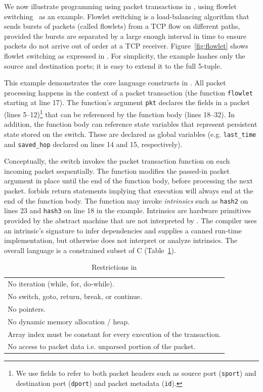 We now illustrate programming using packet transactions in \pktlanguage, using
flowlet switching~\cite{flowlets} as an example. Flowlet switching is a
load-balancing algorithm that sends bursts of packets (called flowlets) from a
TCP flow on different paths, provided the bursts are separated by a large
enough interval in time to ensure packets do not arrive out of order at a TCP
receiver. Figure~\ref{fig:flowlet} shows flowlet switching as expressed in
\pktlanguage. For simplicity, the example hashes only the source and
destination ports; it is easy to extend it to the full 5-tuple.

This example demonstrates the core language constructs in \pktlanguage. All
packet processing happens in the context of a packet transaction (the function
\texttt{flowlet} starting at line 17). The function's argument {\tt pkt} declares the
fields in a packet (lines 5--12)\footnote{We use fields to refer to both packet
headers such as source port ({\tt sport}) and destination port ({\tt dport})
and packet metadata ({\tt id}).} that can be referenced by the function body
(lines 18--32).  In addition, the function body can reference state variables
that represent persistent state stored on the switch. These are declared as
global variables (e.g. \texttt{last\_time} and \texttt{saved\_hop} declared on
lines 14 and 15, respectively).

Conceptually, the switch invokes the packet transaction function on each
incoming packet sequentially. The function modifies the passed-in packet
argument in place until the end of the function body, before processing the
next packet.  \pktlanguage forbids return statements implying that execution
will always end at the end of the function body. The function may invoke
\textit{intrinsics} such as \texttt{hash2} on lines 23 and \texttt{hash3} on
line 18 in the example.  Intrinsics are hardware primitives provided by the
abstract machine that are not interpreted by \pktlanguage. The \pktlanguage
compiler uses an intrinsic's signature to infer dependencies and supplies a
canned run-time implementation, but otherwise does not interpret or analyze
intrinsics. The overall language is a constrained subset of C (Table~\ref{tab:restrict}).
\begin{table}
  \begin{tabular}{p{}}
    No iteration (while, for, do-while).\\
    No switch, goto, return, break, or continue.\\
    No pointers.\\
    No dynamic memory allocation / heap.\\
    Array index must be constant for every execution of the transaction.\\
    No access to packet data i.e. unparsed portion of the packet.\\
  \end{tabular}
  \caption{Restrictions in \pktlanguage}
  \label{tab:restrict}
\end{table}

